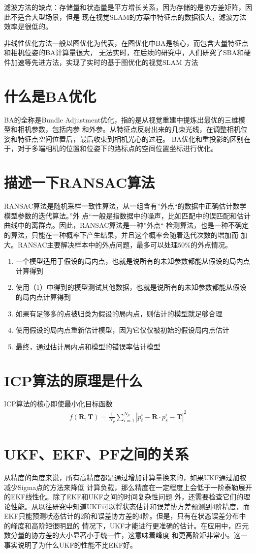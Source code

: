 \documentclass[10pt]{article}
\begin{document}
滤波方法的缺点：存储量和状态量是平方增长关系，因为存储的是协方差矩阵，因此不适合大型场景，但是
现在视觉SLAM的方案中特征点的数据很大，滤波方法效率是很低的。

非线性优化方法一般以图优化为代表，在图优化中BA是核心，而包含大量特征点和相机位姿的BA计算量很大，
无法实时，在后续的研究中，人们研究了SBA和硬件加速等先进方法，实现了实时的基于图优化的视觉SLAM
方法
\section{什么是BA优化}
BA的全称是Bundle Adjustment优化，指的是从视觉重建中提炼出最优的三维模型和相机参数，包括内参
和外参。从特征点反射出来的几束光线，在调整相机位姿和特征点空间位置后，最后收束到相机光心的过程。
BA优化和重投影的区别在于，对于多端相机的位置和位姿下的路标点的空间位置坐标进行优化。
\section{描述一下RANSAC算法}
RANSAC算法是随机采样一致性算法，从一组含有”外点“的数据中正确估计数学模型参数的迭代算法。”外
点“一般是指数据中的噪声，比如匹配中的误匹配和估计曲线中的离群点。因此，RANSAC算法是一种”外点“
检测算法，也是一种不确定的算法，只能在一种概率下产生结果，并且这个概率会随着迭代次数的增加而
加大。RANSAC主要解决样本中的外点问题，最多可以处理50\%的外点情况。
\begin{enumerate}
    \item 一个模型适用于假设的局内点，也就是说所有的未知参数都能从假设的局内点计算得到
    \item 使用（1）中得到的模型测试其他数据，也就是说所有的未知参数都能从假设的局内点计算得到
    \item 如果有足够多的点被归类为假设的局内点，则估计的模型就足够合理
    \item 使用假设的局内点重新估计模型，因为它仅仅被初始的假设局内点估计
    \item 最终，通过估计局内点和模型的错误率估计模型
\end{enumerate}
\section{ICP算法的原理是什么}
ICP算法的核心即使最小化目标函数
\begin{align} 
    f(\mathbf{R},\mathbf{T})=\frac{1}{N_p}\sum_{i=1}^{N_p}|p_{t}^{i}-\mathbf{R}
    \cdot p_{s}^{i}-\mathbf{T}|^{2}
\end{align}
\section{UKF、EKF、PF之间的关系}
从精度的角度来说，所有高精度都是通过增加计算量换来的，如果UKF通过加权减少Sigma点的方法来降低
计算负载，那么精度在一定程度上会低于一阶泰勒展开的EKF线性化。除了EKF和UKF之间的时间复杂性问题
外，还需要检查它们的理论性能。从以往研究中知道UKF可以将状态估计和误差协方差预测到4阶精度，而
EKF只能预测状态估计的2阶和误差协方差的4阶。但是，只有在状态误差分布中的峰度和高阶矩很明显的
情况下，UKF才能进行更准确的估计。在应用中，四元数分量的协方差的大小显著小于统一性，这意味着峰度
和更高阶矩非常小。这一事实说明了为什么UKF的性能不比EKF好。
\end{document}
